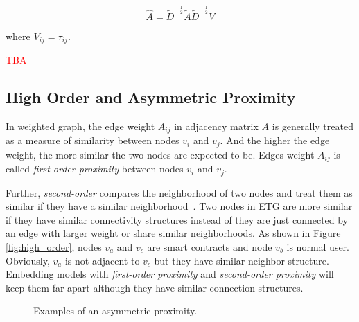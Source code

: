 \begin{equation}
\hat{A}=\tilde{D}^{-\frac{1}{2}}\tilde{A}\tilde{D}^{-\frac{1}{2}}V
\label{eq:?}
\end{equation}

where $V_{ij}=\tau_{ij}$.

\textcolor{red}{TBA}

\subsection{High Order and Asymmetric Proximity}
In weighted graph, the edge weight $A_{ij}$ in adjacency matrix $A$ is generally treated as a measure of similarity between nodes $v_i$ and $v_j$. And the higher the edge weight, the more similar the two nodes are expected to be. Edges weight $A_{ij}$ is called \emph{first-order proximity} between nodes $v_i$ and $v_j$. 

Further, \emph{second-order} compares the neighborhood of two nodes and treat them as similar if they have a similar neighborhood~\cite{goyal2018graph}. Two nodes in ETG are more similar if they have similar connectivity structures instead of they are just connected by an edge with larger weight or share similar neighborhoods. As shown in Figure \ref{fig:high_order}, nodes $v_a$ and $v_c$ are smart contracts and node $v_b$ is normal user. Obviously, $v_a$ is not adjacent to $v_c$  but they have similar neighbor structure. Embedding models with \emph{first-order proximity} and \emph{second-order proximity} will keep them far apart although they have similar connection structures. 

\begin{figure}[htbp]
	\centering
	\caption{Examples of an asymmetric proximity.}

\end{figure}

